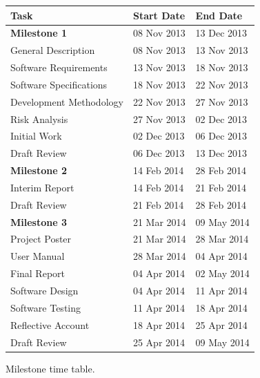 \documentclass[11pt,a4paper]{article}
\renewcommand{\arraystretch}{1.5}
\begin{document}
\renewcommand{\arraystretch}{1.5}
\newcommand*{\tableIndent}{\hspace*{0.4cm}}

\begin{figure}[H]
\centering
\begin{tabular}{|l|l|l|}
\hline \textbf{Task} & \textbf{Start Date} & \textbf{End Date} \\ 
\hline \hline \textbf{Milestone 1} & 08 Nov 2013 & 13 Dec 2013 \\ 
\hline\tableIndent General Description & 08 Nov 2013 & 13 Nov 2013 \\ 
\hline\tableIndent Software Requirements & 13 Nov 2013 & 18 Nov 2013 \\ 
\hline\tableIndent Software Specifications & 18 Nov 2013 & 22 Nov 2013 \\ 
\hline\tableIndent Development Methodology & 22 Nov 2013 & 27 Nov 2013 \\ 
\hline\tableIndent Risk Analysis & 27 Nov 2013 & 02 Dec 2013 \\ 
\hline\tableIndent Initial Work  & 02 Dec 2013 & 06 Dec 2013 \\ 
\hline\tableIndent Draft Review  & 06 Dec 2013 & 13 Dec 2013 \\ 
\hline\textbf{Milestone 2} & 14 Feb 2014 & 28 Feb 2014 \\ 
\hline\tableIndent Interim Report & 14 Feb 2014 & 21 Feb 2014 \\ 
\hline\tableIndent Draft Review & 21 Feb 2014 & 28 Feb 2014 \\
\hline\textbf{Milestone 3} & 21 Mar 2014 & 09 May 2014 \\ 
\hline\tableIndent Project Poster & 21 Mar 2014 & 28 Mar 2014 \\ 
\hline\tableIndent User Manual & 28 Mar 2014 & 04 Apr 2014 \\ 
\hline\tableIndent Final Report & 04 Apr 2014 & 02 May 2014 \\
\hline\tableIndent\tableIndent Software Design & 04 Apr 2014 & 11 Apr 2014 \\ 
\hline\tableIndent\tableIndent Software Testing & 11 Apr 2014 & 18 Apr 2014 \\ 
\hline\tableIndent\tableIndent Reflective Account & 18 Apr 2014 & 25 Apr 2014 \\
\hline\tableIndent\tableIndent Draft Review & 25 Apr 2014 & 09 May 2014 \\
\hline 
\end{tabular}

\caption{Milestone time table.\label{fig:milestones-table}}
\end{figure}
\end{document}
